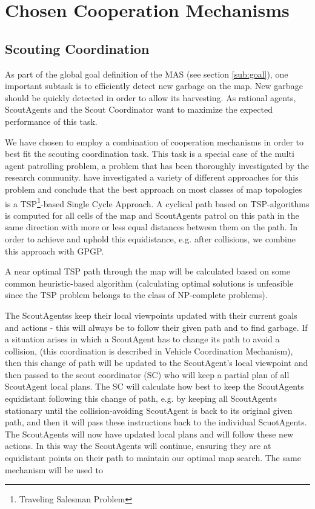 \section{Chosen Cooperation Mechanisms}
\label{sec:chosCoop}


\subsection{Scouting Coordination}

As part of the global goal definition of the MAS (see section \ref{sub:goal}), one important subtask is to efficiently detect new garbage on the map. New garbage should be quickly detected in order to allow its harvesting. As rational agents, ScoutAgents and the Scout Coordinator want to maximize the expected performance of this task.

We have chosen to employ a combination of cooperation mechanisms in order to best fit the scouting coordination task. This task is a special case of the multi agent patrolling problem, a problem that has been thoroughly investigated by the research community. \cite{Almeida2004} have investigated a variety of different approaches for this problem and conclude that the best approach on most classes of map topologies is a TSP\footnote{Traveling Salesman Problem}-based Single Cycle Approach. A cyclical path based on TSP-algorithms is computed for all cells of the map and ScoutAgents patrol on this path in the same direction with more or less equal distances between them on the path. In order to achieve and uphold this equidistance, e.g. after collisions, we combine this approach with GPGP.

A near optimal TSP path through the map will be calculated based on some common heuristic-based algorithm (calculating optimal solutions is unfeasible since the TSP problem belongs to the class of NP-complete problems).  


The ScoutAgentss keep their local viewpoints updated with their current goals and actions - this will always be to follow their given path and to find garbage. If a situation arises in which a ScoutAgent has to change its path to avoid a collision, (this coordination is described in Vehicle Coordination Mechanism), then this change of path will be updated to the ScoutAgent’s local viewpoint and then passed to the scout coordinator (SC) who will keep a partial plan of all ScoutAgent local plans. The SC will calculate how best to keep the ScoutAgents equidistant following this change of path, e.g. by keeping all ScoutAgents stationary until the collision-avoiding ScoutAgent is back to its original given path, and then it will pass these instructions back to the individual ScuotAgents. The ScoutAgents will now have updated local plans and will follow these new actions. In this way the ScoutAgents will continue, ensuring they are at equidistant points on their path to maintain our optimal map search. The same mechanism will be used to 
  


